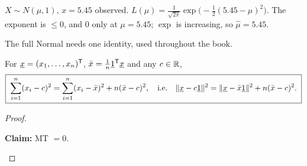 \begin{example}
$X\sim N(\mu,1)$, $x=5.45$ observed. $L(\mu)=\frac{1}{\sqrt{2\pi}}\exp\big(-\frac12(5.45-\mu)^2\big)$. The exponent is $\le0$, and $0$ only at $\mu=5.45$; $\exp$ is increasing, so $\hat\mu=5.45$.
\end{example}

The full Normal needs one identity, used throughout the book.

\begin{lemma}
For $\underline{x}=(x_1,\dots,x_n)^{\mathsf{T}}$, $\bar x=\frac1n\underline{1}^{\mathsf{T}}\underline{x}$ and any $c\in\mathbb{R}$,
\[
  \boxed{\;\sum_{i=1}^n(x_i-c)^2=\sum_{i=1}^n(x_i-\bar x)^2+n(\bar x-c)^2,\quad\text{i.e.}\quad \|\underline{x}-c\underline{1}\|^2=\|\underline{x}-\bar x\underline{1}\|^2+n(\bar x-c)^2.\;}
\]
\end{lemma}
\begin{proof}
\begin{deriv}
\end{deriv}
\textbf{Claim:} MT $=0$.
\begin{deriv}
\end{deriv}
\end{proof}

